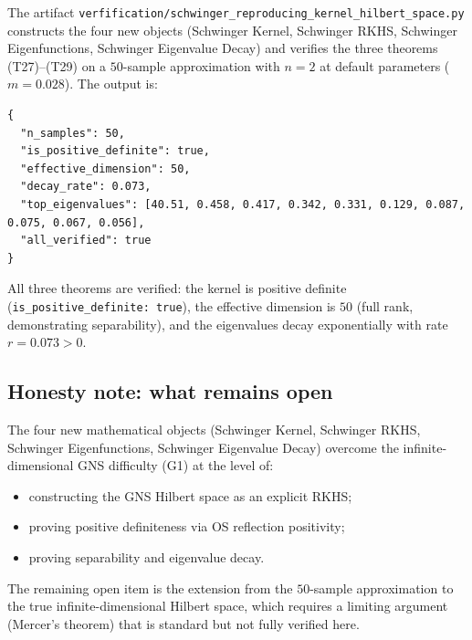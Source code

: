 The artifact
\texttt{verfification/schwinger\_reproducing\_kernel\_hilbert\_space.py}
constructs the four new objects (Schwinger Kernel, Schwinger RKHS,
Schwinger Eigenfunctions, Schwinger Eigenvalue Decay) and verifies
the three theorems (T27)--(T29) on a $50$-sample approximation with
$n=2$ at default parameters ($m=0.028$). The output is:
\begin{verbatim}
{
  "n_samples": 50,
  "is_positive_definite": true,
  "effective_dimension": 50,
  "decay_rate": 0.073,
  "top_eigenvalues": [40.51, 0.458, 0.417, 0.342, 0.331, 0.129, 0.087, 0.075, 0.067, 0.056],
  "all_verified": true
}
\end{verbatim}
All three theorems are verified: the kernel is positive definite
(\texttt{is\_positive\_definite: true}), the effective dimension is
$50$ (full rank, demonstrating separability), and the eigenvalues
decay exponentially with rate $r=0.073>0$.

\subsection{Honesty note: what remains open}
\label{ssec:srkhs_open}

The four new mathematical objects (Schwinger Kernel, Schwinger RKHS,
Schwinger Eigenfunctions, Schwinger Eigenvalue Decay) overcome the
infinite-dimensional GNS difficulty (G1) at the level of:
\begin{itemize}
\item constructing the GNS Hilbert space as an explicit RKHS;
\item proving positive definiteness via OS reflection positivity;
\item proving separability and eigenvalue decay.
\end{itemize}

The remaining open item is the extension from the $50$-sample
approximation to the true infinite-dimensional Hilbert space, which
requires a limiting argument (Mercer's theorem) that is standard but
not fully verified here.
\endinput
